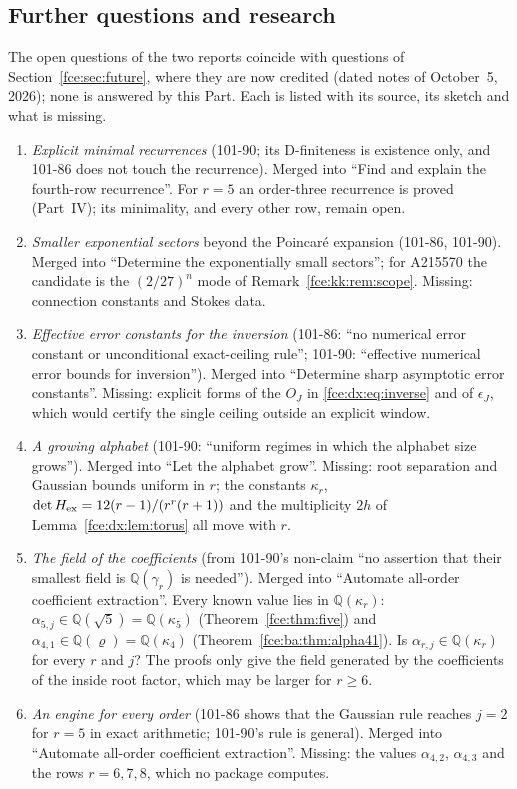 \documentclass[11pt,a4paper]{article}
\numberwithin{equation}{section}
\theoremstyle{definition}\newtheorem{definition}[theorem]{Definition}
\theoremstyle{remark}\newtheorem{remark}[theorem]{Remark}
\newcommand{\Q}{\mathbb Q}
\begin{document}
\subsection{Further questions and research}\label{fce:dx:sec:questions}
The open questions of the two reports coincide with questions of
Section~\ref{fce:sec:future}, where they are now credited (dated notes of
October~5, 2026); none is answered by this Part. Each is listed with its
source, its sketch and what is missing.
\begin{enumerate}[label=101.\arabic*]
\item \emph{Explicit minimal recurrences} (101-90; its
D-finiteness is existence only, and 101-86 does not touch the recurrence).
Merged into ``Find and explain the fourth-row recurrence''. For $r=5$ an
order-three recurrence is proved (Part~IV); its minimality, and every other
row, remain open.
\item \emph{Smaller exponential sectors} beyond the Poincar\'e expansion
(101-86, 101-90). Merged into ``Determine the exponentially small sectors'';
for A215570 the candidate is the $(2/27)^n$ mode of
Remark~\ref{fce:kk:rem:scope}. Missing: connection constants and Stokes data.
\item \emph{Effective error constants for the inversion} (101-86: ``no
numerical error constant or unconditional exact-ceiling rule''; 101-90:
``effective numerical error bounds for inversion''). Merged into ``Determine
sharp asymptotic error constants''. Missing: explicit forms of the $O_J$ in
\eqref{fce:dx:eq:inverse} and of $\epsilon_J$, which would certify the single
ceiling outside an explicit window.
\item \emph{A growing alphabet} (101-90: ``uniform regimes in which the
alphabet size grows''). Merged into ``Let the alphabet grow''. Missing: root
separation and Gaussian bounds uniform in $r$; the constants
$\kappa_r$, $\det H_{\rm ex}=12(r-1)/(r^r(r+1))$ and the multiplicity $2h$
of Lemma~\ref{fce:dx:lem:torus} all move with $r$.
\item \emph{The field of the coefficients} (from 101-90's non-claim ``no
assertion that their smallest field is $\Q(\gamma_r)$ is needed''). Merged into
``Automate all-order coefficient extraction''. Every known value lies in
$\Q(\kappa_r)$: $\alpha_{5,j}\in\Q(\sqrt5)=\Q(\kappa_5)$
(Theorem~\ref{fce:thm:five}) and $\alpha_{4,1}\in\Q(\varrho)=\Q(\kappa_4)$
(Theorem~\ref{fce:ba:thm:alpha41}). Is $\alpha_{r,j}\in\Q(\kappa_r)$ for every
$r$ and $j$? The proofs only give the field generated by the coefficients of
the inside root factor, which may be larger for $r\ge6$.
\item \emph{An engine for every order} (101-86 shows that the Gaussian rule
reaches $j=2$ for $r=5$ in exact arithmetic; 101-90's rule is general).
Merged into ``Automate all-order coefficient extraction''. Missing: the
values $\alpha_{4,2}$, $\alpha_{4,3}$ and the rows $r=6,7,8$, which no
package computes.
\end{enumerate}
\end{document}
